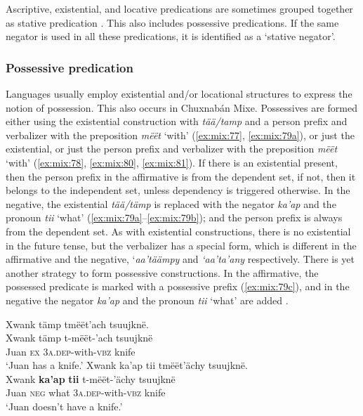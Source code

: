 \documentclass[output=paper,colorlinks,citecolor=brown,draft]{langscibook}
\begin{document}
Ascriptive, existential, and locative predications are sometimes grouped together as stative predication \citep[111]{Veselinova2013neg.exist}. This also includes possessive predications. If the same negator is used in all these predications, it is identified as a ‘stative negator’. 

\subsubsection{Possessive predication}\label{sec:mix:2.3.6}

Languages usually employ existential and/or locational structures to express the notion of possession. This also occurs in Chuxnabán Mixe. Possessives are formed either using the existential construction with \textit{tää/tamp} and a person prefix and verbalizer with the preposition \textit{mëët} ‘with’ (\ref{ex:mix:77}, \ref{ex:mix:79a}), or just the existential, or just the person prefix and verbalizer with the preposition \textit{mëët} ‘with’ (\ref{ex:mix:78}, \ref{ex:mix:80}, \ref{ex:mix:81}). If there is an existential present, then the person prefix in the affirmative is from the dependent set, if not, then it belongs to the independent set, unless dependency is triggered otherwise. In the negative, the existential \textit{tää/tämp} is replaced with the negator \textit{ka’ap} and the pronoun \textit{tii} ‘what’ (\ref{ex:mix:79a}--\ref{ex:mix:79b}); and the person prefix is always from the dependent set. As with existential constructions, there is no existential in the future tense, but the verbalizer has a special form, which is different in the affirmative and the negative, ‘\textit{aa’täämpy} and \textit{‘aa’ta’any} respectively. There is yet another strategy to form possessive constructions. In the affirmative, the possessed predicate is marked with a possessive prefix (\ref{ex:mix:79c}), and in the negative the negator \textit{ka’ap} and the pronoun \textit{tii} ‘what’ are added .


\ea\label{ex:mix:77}
    \ea\label{ex:mix:77a}
        \glll Xwank tämp tmëët’ach tsuujknë.\\ 
              Xwank tämp t-mëët-’ach tsuujknë\\
              Juan \textsc{ex} \textsc{3a.dep}{}-with-\textsc{vbz} knife\\
        \glt ‘Juan has a knife.’
    \ex\label{ex:mix:77b}
        \glll Xwank ka’ap tii tmëët’ächy tsuujknë.\\
             Xwank \textbf{ka’ap} \textbf{tii} t-mëët-’ächy tsuujknë\\
             Juan \textsc{neg} what \textsc{3a.dep}{}-with-\textsc{vbz} knife\\
        \glt ‘Juan doesn’t have a knife.’
    \z
\z 
\end{document}
